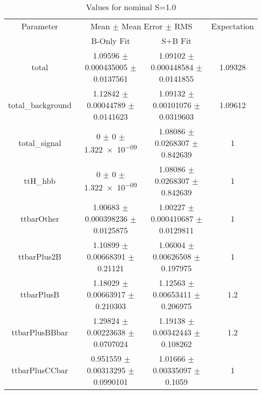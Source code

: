 \begin{table}
\centering
\caption{Values for nominal S=1.0}
\begin{tabular}{cccc}
\toprule
Parameter & \multicolumn{2}{c}{Mean $\pm$ Mean Error $\pm$ RMS} & Expectation\\
 & B-Only Fit & S+B Fit & \\
\midrule
total & \num{1.09596} $\pm$ \num{0.000435005} $\pm$ \num{0.0137561} & \num{1.09102} $\pm$ \num{0.000448584} $\pm$ \num{0.0141855} & \num{1.09328}\\
total\_background & \num{1.12842} $\pm$ \num{0.00044789} $\pm$ \num{0.0141623} & \num{1.09132} $\pm$ \num{0.00101076} $\pm$ \num{0.0319603} & \num{1.09612}\\
total\_signal & \num{0} $\pm$ \num{0} $\pm$ \num{1.322e-09} & \num{1.08086} $\pm$ \num{0.0268307} $\pm$ \num{0.842639} & \num{1}\\
ttH\_hbb & \num{0} $\pm$ \num{0} $\pm$ \num{1.322e-09} & \num{1.08086} $\pm$ \num{0.0268307} $\pm$ \num{0.842639} & \num{1}\\
ttbarOther & \num{1.00683} $\pm$ \num{0.000398236} $\pm$ \num{0.0125875} & \num{1.00227} $\pm$ \num{0.000410687} $\pm$ \num{0.0129811} & \num{1}\\
ttbarPlus2B & \num{1.10899} $\pm$ \num{0.00668391} $\pm$ \num{0.21121} & \num{1.06004} $\pm$ \num{0.00626508} $\pm$ \num{0.197975} & \num{1}\\
ttbarPlusB & \num{1.18029} $\pm$ \num{0.00663917} $\pm$ \num{0.210303} & \num{1.12563} $\pm$ \num{0.00653411} $\pm$ \num{0.206975} & \num{1.2}\\
ttbarPlusBBbar & \num{1.29824} $\pm$ \num{0.00223638} $\pm$ \num{0.0707024} & \num{1.19138} $\pm$ \num{0.00342443} $\pm$ \num{0.108262} & \num{1.2}\\
ttbarPlusCCbar & \num{0.951559} $\pm$ \num{0.00313295} $\pm$ \num{0.0990101} & \num{1.01666} $\pm$ \num{0.00335097} $\pm$ \num{0.1059} & \num{1}\\
\bottomrule
\end{tabular}
\end{table}
